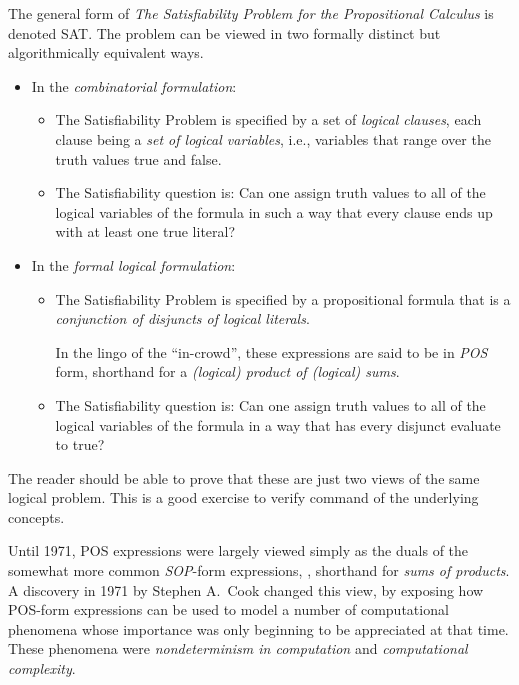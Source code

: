 The general form of {\it The Satisfiability Problem for the
  Propositional Calculus} 
is denoted {\sf SAT}.  
The problem can be viewed in two formally distinct but algorithmically
equivalent ways.
\begin{itemize}
\item
In the {\it combinatorial formulation}:
  \begin{itemize}
  \item
The Satisfiability Problem is specified by a set of {\it logical
  clauses}, each clause being a {\it set of {\em logical} variables},
i.e., variables that range over the truth values {\small\sf true} and
{\small\sf false}.
  \item
The Satisfiability question is: Can one assign truth values to all of
the logical variables of the formula in such a way that every clause
ends up with at least one {\small\sf true} literal?
  \end{itemize}
\item
In the {\it formal logical formulation}:
  \begin{itemize}
  \item
The Satisfiability Problem is specified by a propositional formula that
is  a {\it conjunction of disjuncts of logical literals}.

In the lingo of the ``in-crowd'', these expressions are said to be in
{\it POS} form,  shorthand for a {\it
  (logical) product of (logical) sums}.
  \item
The Satisfiability question is: Can one assign truth values to all of
the logical variables of the formula in a way that has every disjunct
evaluate to {\small\sf true}?
  \end{itemize}
\end{itemize}
The reader should be able to prove that these are just two views of
the same logical problem.  {\Arny This is a good exercise to verify
  command of the underlying concepts.}

Until 1971, POS expressions were largely viewed simply as the duals of
the somewhat more common {\it SOP}-form expressions, 
, shorthand for {\it sums of products}.  A
 discovery in 1971 by Stephen A.~Cook 
 changed this view, by exposing how POS-form expressions can be used
 to model a number of computational phenomena whose importance was
 only beginning to be appreciated at that time.  These phenomena were
{\it nondeterminism in computation}
 and {\it computational complexity}.

